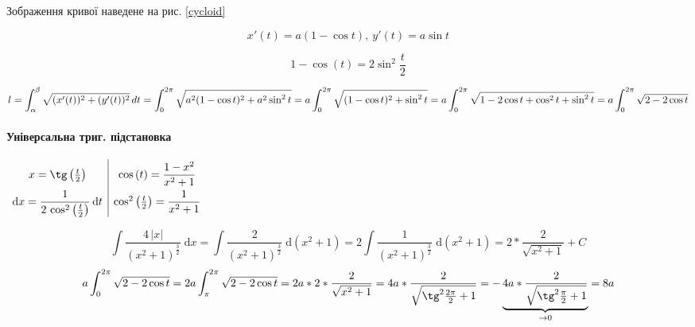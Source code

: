 \documentclass[../rgr1.tex]{subfiles}
\begin{document}
\Solution

Зображення кривої наведене на рис. \ref{cycloid}

\begin{equation}
	x'(t) = a(1-\cos t),~
	y'(t) = a\sin t
\end{equation}

\begin{equation}
	1-\cos(t) = 2\sin^2\frac{t}{2}
\end{equation}

\begin{dmath}
	l = \int_\alpha^\beta \sqrt{(x'(t))^2+(y'(t))^2}\,dt
	= \int_0^{2\pi} \sqrt{a^2(1-\cos t)^2 + a^2\sin^2t}
	= a\int_0^{2\pi} \sqrt{(1-\cos t)^2 + \sin^2t}
	= a\int_0^{2\pi} \sqrt{1-2\cos t +\cos^2t + \sin^2t}
	= a\int_0^{2\pi} \sqrt{2-2\cos t}
	\\
\end{dmath}

\paragraph{Універсальна триг. підстановка}
\begin{varwidth}{1in}
	\fbox
{
	$
	\def\arraystretch{2}\begin{array}{c|c}x=\tg\left(\frac{t}{2}\right)&\cos\left(t\right)=\dfrac{1-{x}^{2}}{{x}^{2}+1}\\\mathrm{d}x=\dfrac{1}{2\,\cos^{2}\left(\frac{t}{2}\right)}\,\mathrm{d}t&\cos^{2}\left(\frac{t}{2}\right)=\dfrac{1}{{x}^{2}+1}\end{array}
		$
}
\end{varwidth}

\begin{dmath}
	\int{\dfrac{4\,\left|x\right|}{\left({{x}^{2}+1}\right)^{\frac{3}{2}}}}{\;\mathrm{d}x} =
	\int{\dfrac{2}{\left({{x}^{2}+1}\right)^{\frac{3}{2}}}}{\;\mathrm{d}(x^2+1)}
	=2\int{\dfrac{1}{\left({{x}^{2}+1}\right)^{\frac{3}{2}}}}{\;\mathrm{d}(x^2+1)}
	=2*\frac{2}{\sqrt{x^2+1}}+C
\end{dmath}
\begin{dmath}
	a\int_0^{2\pi} \sqrt{2-2\cos t}=
	2a\int_\pi^{2\pi} \sqrt{2-2\cos t}=
	2a*2*\frac{2}{\sqrt{x^2+1}}=
	4a*\frac{2}{\sqrt{\tg^2\frac{2\pi}{2}+1}}=
	-\underbrace{4a*\frac{2}{\sqrt{\tg^2\frac{\pi}{2}+1}}}_{\to 0} = 8a
\end{dmath}


\end{document}
